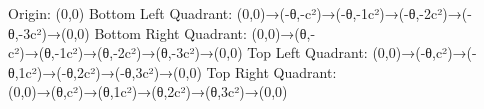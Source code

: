 Origin: (0,0)
Bottom Left Quadrant: (0,0)→(-θ,-c²)→(-θ,-1c²)→(-θ,-2c²)→(-θ,-3c²)→(0,0)
Bottom Right Quadrant: (0,0)→(θ,-c²)→(θ,-1c²)→(θ,-2c²)→(θ,-3c²)→(0,0)
Top Left Quadrant: (0,0)→(-θ,c²)→(-θ,1c²)→(-θ,2c²)→(-θ,3c²)→(0,0)
Top Right Quadrant: (0,0)→(θ,c²)→(θ,1c²)→(θ,2c²)→(θ,3c²)→(0,0)
